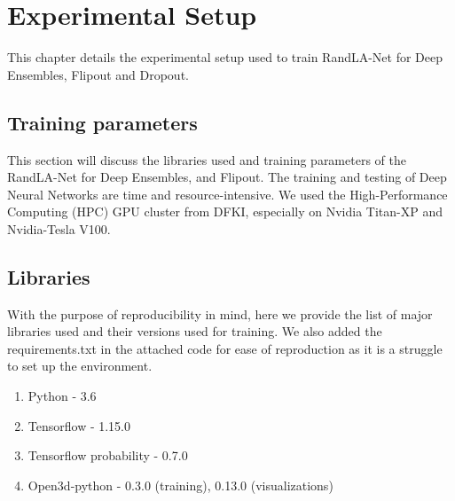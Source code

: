 

    \chapter{Experimental Setup}
    This chapter details the experimental setup used to train RandLA-Net for Deep Ensembles, Flipout and Dropout.



    \section{Training parameters}
    This section will discuss the libraries used and training parameters of the RandLA-Net for Deep Ensembles, and Flipout.    The training and testing of Deep Neural Networks are time and resource-intensive.
    We used the High-Performance Computing (HPC) GPU cluster from DFKI, especially on Nvidia Titan-XP and Nvidia-Tesla V100.
    \section{Libraries}
    With the purpose of reproducibility in mind, here we provide the list of major libraries used and their versions used for training.
    We also added the requirements.txt in the attached code for ease of reproduction as it is a struggle to set up the environment.
    \begin{enumerate}
        \item Python - 3.6
        \item Tensorflow - 1.15.0
        \item Tensorflow probability - 0.7.0
        \item Open3d-python - 0.3.0 (training), 0.13.0 (visualizations)
    \end{enumerate}
    
